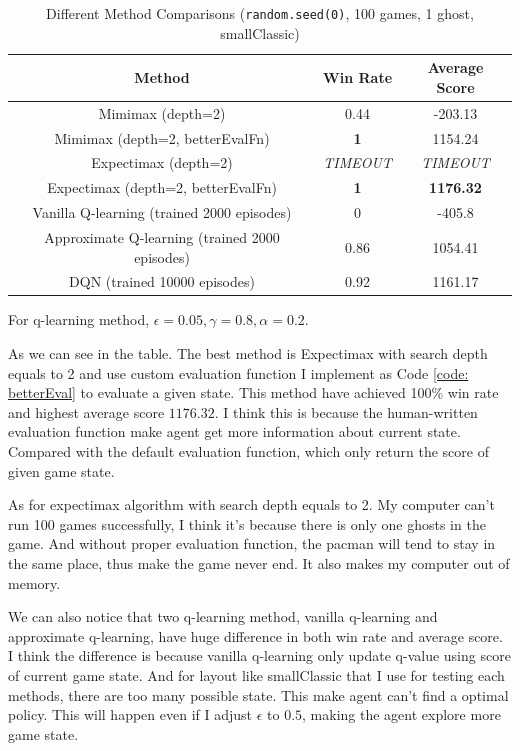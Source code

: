 \documentclass{article}[12pt]
\begin{document}
\begin{table}[H]
\centering
\caption{Different Method Comparisons (\texttt{random.seed(0)}, 100 games, 1 ghost, smallClassic)}
\begin{tabular}{ccc} 
\toprule
\textbf{Method}                      & \textbf{Win Rate} & \textbf{Average Score}  \\ 
\hline
Mimimax (depth=2)                    & 0.44              & -203.13                 \\
Mimimax (depth=2,
  betterEvalFn)    & \textbf{1}        & 1154.24                 \\
Expectimax (depth=2)                 &               \textit{TIMEOUT}    &     \textit{TIMEOUT}                    \\
Expectimax (depth=2,
  betterEvalFn) & \textbf{1}        & \textbf{1176.32}        \\
Vanilla Q-learning (trained 2000 episodes)                  & 0                 & -405.8                  \\
Approximate Q-learning (trained 2000 episodes)               & 0.86              & 1054.41                 \\
DQN (trained 10000 episodes)                                 & 0.92              & 1161.17                 \\
\bottomrule
\end{tabular}
\end{table}

For q-learning method, $\epsilon=0.05, \gamma=0.8, \alpha=0.2$.

As we can see in the table. The best method is Expectimax with search depth equals to 2 and use custom evaluation function I implement as Code \ref{code: betterEval} to evaluate a given state. This method have achieved 100\% win rate and highest average score $1176.32$. I think this is because the human-written evaluation function make agent get more information about current state. Compared with the default evaluation function, which only return the score of given game state.

As for expectimax algorithm with search depth equals to 2. My computer can't run 100 games successfully, I think it's because there is only one ghosts in the game. And without proper evaluation function, the pacman will tend to stay in the same place, thus make the game never end. It also makes my computer out of memory.

We can also notice that two q-learning method, vanilla q-learning and approximate q-learning, have huge difference in both win rate and average score. I think the difference is because vanilla q-learning only update q-value using score of current game state. And for layout like smallClassic that I use for testing each methods, there are too many possible state. This make agent can't find a optimal policy. This will happen even if I adjust $\epsilon$ to $0.5$, making the agent explore more game state. 
\end{document}
